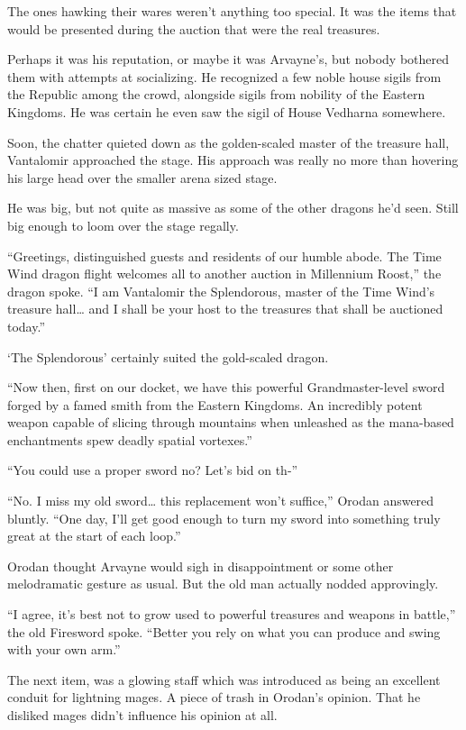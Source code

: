 \documentclass[a4paper,10pt]{book}
\begin{document}
The ones hawking their wares weren’t anything too special. It was the items that would be presented during the auction that were the real treasures.\par
Perhaps it was his reputation, or maybe it was Arvayne’s, but nobody bothered them with attempts at socializing. He recognized a few noble house sigils from the Republic among the crowd, alongside sigils from nobility of the Eastern Kingdoms. He was certain he even saw the sigil of House Vedharna somewhere.\par
Soon, the chatter quieted down as the golden-scaled master of the treasure hall, Vantalomir approached the stage. His approach was really no more than hovering his large head over the smaller arena sized stage.\par
He was big, but not quite as massive as some of the other dragons he’d seen. Still big enough to loom over the stage regally.\par
“Greetings, distinguished guests and residents of our humble abode. The Time Wind dragon flight welcomes all to another auction in Millennium Roost,” the dragon spoke. “I am Vantalomir the Splendorous, master of the Time Wind’s treasure hall… and I shall be your host to the treasures that shall be auctioned today.”\par
‘The Splendorous’ certainly suited the gold-scaled dragon.\par
“Now then, first on our docket, we have this powerful Grandmaster-level sword forged by a famed smith from the Eastern Kingdoms. An incredibly potent weapon capable of slicing through mountains when unleashed as the mana-based enchantments spew deadly spatial vortexes.”\par
“You could use a proper sword no? Let’s bid on th-”\par
“No. I miss my old sword… this replacement won’t suffice,” Orodan answered bluntly. “One day, I’ll get good enough to turn my sword into something truly great at the start of each loop.”\par
Orodan thought Arvayne would sigh in disappointment or some other melodramatic gesture as usual. But the old man actually nodded approvingly.\par
“I agree, it’s best not to grow used to powerful treasures and weapons in battle,” the old Firesword spoke. “Better you rely on what you can produce and swing with your own arm.”\par
The next item, was a glowing staff which was introduced as being an excellent conduit for lightning mages. A piece of trash in Orodan’s opinion. That he disliked mages didn’t influence his opinion at all.\par
\end{document}
